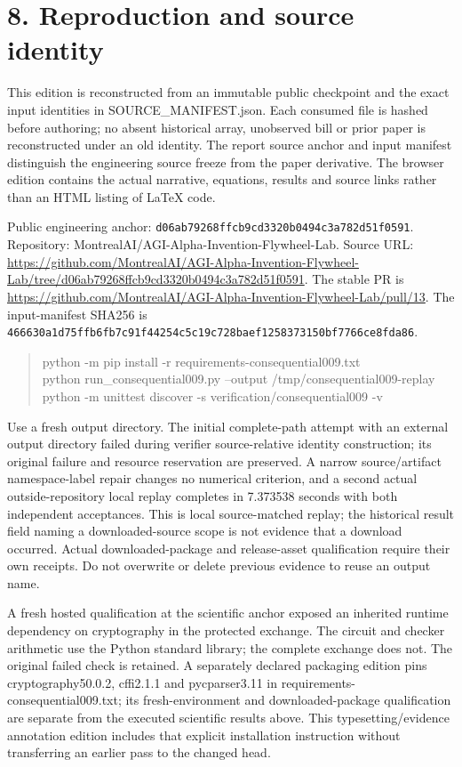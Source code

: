 \documentclass[10pt,letterpaper]{article}
\begin{document}
\section*{\color{accent}8. Reproduction and source identity}
This edition is reconstructed from an immutable public checkpoint and the exact input identities in SOURCE\_\allowbreak{}MANIFEST.json. Each consumed file is hashed before authoring; no absent historical array, unobserved bill or prior paper is reconstructed under an old identity. The report source anchor and input manifest distinguish the engineering source freeze from the paper derivative. The browser edition contains the actual narrative, equations, results and source links rather than an HTML listing of LaTeX code.\par
Public engineering anchor: \texttt{d06ab79268ff\allowbreak{}cb9cd3320b04\allowbreak{}94c3a782d51f\allowbreak{}0591}. Repository: MontrealAI/AGI-Alpha-Invention-Flywheel-Lab. Source URL: \url{https://github.com/MontrealAI/AGI-Alpha-Invention-Flywheel-Lab/tree/d06ab79268ffcb9cd3320b0494c3a782d51f0591}. The stable PR is \url{https://github.com/MontrealAI/AGI-Alpha-Invention-Flywheel-Lab/pull/13}. The input-manifest SHA256 is \texttt{466630a1d75f\allowbreak{}fb6fb7c91f44\allowbreak{}254c5c19c728\allowbreak{}baef12583731\allowbreak{}50bf7766ce8f\allowbreak{}da86}.\par
\begin{quote}\footnotesize\ttfamily\raggedright python -m pip install -r requirements-consequential009.txt\\python run\_\allowbreak{}consequential009.py --output /tmp/consequential009-replay\\python -m unittest discover -s verification/consequential009 -v\end{quote}
Use a fresh output directory. The initial complete-path attempt with an external output directory failed during verifier source-relative identity construction; its original failure and resource reservation are preserved. A narrow source/artifact namespace-label repair changes no numerical criterion, and a second actual outside-repository local replay completes in 7.373538 seconds with both independent acceptances. This is local source-matched replay; the historical result field naming a downloaded-source scope is not evidence that a download occurred. Actual downloaded-package and release-asset qualification require their own receipts. Do not overwrite or delete previous evidence to reuse an output name.\par
A fresh hosted qualification at the scientific anchor exposed an inherited runtime dependency on cryptography in the protected exchange. The circuit and checker arithmetic use the Python standard library; the complete exchange does not. The original failed check is retained. A separately declared packaging edition pins cryptography50.0.2, cffi2.1.1 and pycparser3.11 in requirements-consequential009.txt; its fresh-environment and downloaded-package qualification are separate from the executed scientific results above. This typesetting/evidence annotation edition includes that explicit installation instruction without transferring an earlier pass to the changed head.\par
\end{document}
